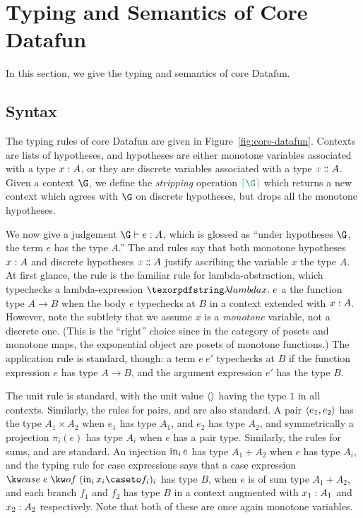 \section{Typing and Semantics of Core Datafun}
\label{sec:typing-and-semantics}

In this section, we give the typing and semantics of core Datafun. 


\subsection{Syntax}

The typing rules of core Datafun are given in Figure~\ref{fig:core-datafun}.
Contexts are lists of hypotheses, and hypotheses are either monotone variables
associated with a type ${x} : {A}$, or they are discrete variables associated
with a type $\hd x A$. Given a context $\G$, we define the \emph{stripping}
operation $\stripcx\G$ which returns a new context which agrees with $\G$
on discrete hypotheses, but drops all the monotone hypotheses.

We now give a judgement $\J{e}{\G}{A}$, which is glossed as ``under
hypotheses $\G$, the term $e$ has the type $A$.'' The  and 
rules say that both monotone hypotheses ${x} : {A}$ and discrete hypotheses
$\hd x A$ justify ascribing the variable $x$ the type $A$. At first glance,
the  rule is the familiar rule for lambda-abstraction, which
typechecks a lambda-expression $\fnof x e$ a the function type $A \to B$
when the body $e$ typechecks at $B$ in a context extended with ${x} : {A}$. However, note the subtlety that we assume $x$ is a \emph{monotone}
variable, not a discrete one. (This is the ``right'' choice since in the
category of posets and monotone maps, the exponential object are posets of
monotone functions.) The application rule  is standard, though: a
term $e\>e'$ typechecks at $B$ if the function expression $e$ has type
$A \to B$, and the argument expression $e'$ has the type $B$.

The unit rule  is standard, with the unit value $\langle{}\rangle$ having
the type $1$ in all contexts. Similarly, the rules for pairs,  and
 are also standard. A pair $\langle{e_1, e_2}\rangle$ has the type
$A_1 \times A_2$ when $e_1$ has type $A_1$, and $e_2$ has type $A_2$, and
symmetrically a projection $\pi_i(e)$ has type $A_i$ when $e$ has a pair
type. Similarly, the rules for sums,  and  are standard.
An injection $\mathrm{in}_{i}\, e$ has type $A_1 + A_2$ when $e$ has type $A_i$, and
the typing rule for case expressions  says that a case
expression $\ecase{e} (\inj i {x_i} \caseto f_i)_i$ has type $B$, when
$e$ is of sum type $A_1 + A_2$, and each branch $f_1$ and $f_2$ has type $B$
in a context augmented with ${x_1} : {A_1}$ and ${x_2} : {A_2}$ respectively.
Note that both of these are once again monotone variables.

